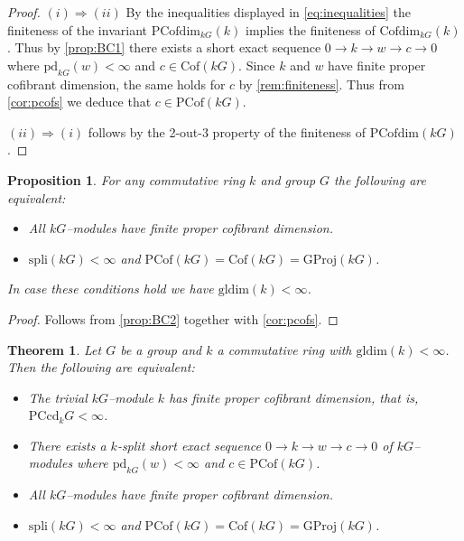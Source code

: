 \documentclass{amsart}
\numberwithin{equation}{section}%
\newtheorem{theorem}[equation]{Theorem}
\newtheorem{proposition}[equation]{Proposition}
\theoremstyle{remark}
\begin{document}
{\begin{proof}
$(i)\Rightarrow(ii)$ By the inequalities displayed in \eqref{eq:inequalities} the finiteness of the invariant $\mathrm{PCofdim}_{kG}(k)$ implies the finiteness of $\mathrm{Cofdim}_{kG}(k)$. Thus by \cref{prop:BC1} there exists a short exact sequence $0\rightarrow k\rightarrow w\rightarrow c\rightarrow 0$ where $\mathrm{pd}_{kG}(w)<\infty$ and $c\in\mathrm{Cof}(kG)$. Since $k$ and $w$ have finite proper cofibrant dimension, the same holds for $c$ by \cref{rem:finiteness}. Thus from \cref{cor:pcofs} we deduce that $c\in\mathrm{PCof}(kG)$. 

$(ii)\Rightarrow(i)$ follows by the 2-out-3 property of the finiteness of $\mathrm{PCofdim}(kG)$.
\end{proof}

\begin{proposition}
\label{prop:PC2}
For any commutative ring $k$ and group $G$ the following are equivalent:
\begin{itemize}
    \item[(i)] All $kG$--modules have finite proper cofibrant dimension.
    \item[(ii)] $\mathrm{spli}(kG)<\infty$ and $\mathrm{PCof}(kG)=\mathrm{Cof}(kG)=\mathrm{GProj}(kG)$.
\end{itemize}
In case these conditions hold we have $\mathrm{gldim}(k)<\infty$.
\end{proposition}

\begin{proof}
Follows from \cref{prop:BC2} together with \cref{cor:pcofs}.
\end{proof}

\begin{theorem}
\label{thm:PCcd}
Let $G$ be a group and $k$ a commutative ring with $\mathrm{gldim}(k)<\infty$. Then the following are equivalent:
\begin{itemize}
\item[(i)] The trivial $kG$--module $k$ has finite proper cofibrant dimension, that is, $\mathrm{PCcd}_{k}G<\infty$.
\item[(ii)] There exists a $k$-split short exact sequence $0\rightarrow k\rightarrow w\rightarrow c\rightarrow 0$ of $kG$--modules where $\mathrm{pd}_{kG}(w)<\infty$ and $c\in\mathrm{PCof}(kG)$.
\item[(iii)] All $kG$--modules have finite proper cofibrant dimension.
\item[(iv)] $\mathrm{spli}(kG)<\infty$ and $\mathrm{PCof}(kG)=\mathrm{Cof}(kG)=\mathrm{GProj}(kG)$.
\end{itemize}
\end{theorem}

}
\end{document}
